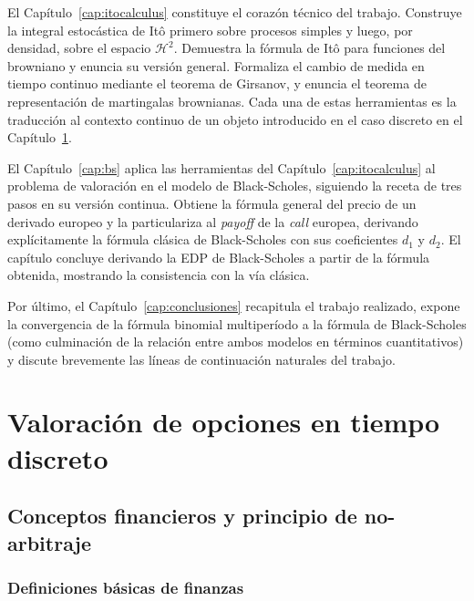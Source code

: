 \documentclass[11pt,a4paper,oneside]{report}
\theoremstyle{plain}
\theoremstyle{definition}
\theoremstyle{remark}
\newcommand{\1}{\mathbf{1}}
\begin{document}
El Capítulo~\ref{cap:itocalculus} constituye el corazón técnico del trabajo. Construye la integral
estocástica de Itô primero sobre procesos simples y luego, por
densidad, sobre el espacio $\mathcal{H}^2$. Demuestra la fórmula de
Itô para funciones del browniano y enuncia su versión general. Formaliza
el cambio de medida en tiempo continuo mediante el teorema de
Girsanov, y enuncia el teorema de representación de martingalas
brownianas. Cada una de estas herramientas es la traducción al contexto
continuo de un objeto introducido en el caso discreto en el
Capítulo~\ref{cap:discreto}.

El Capítulo~\ref{cap:bs} aplica las herramientas del Capítulo~\ref{cap:itocalculus} al problema
de valoración en el modelo de Black-Scholes, siguiendo la receta de
tres pasos en su versión continua. Obtiene la fórmula general del
precio de un derivado europeo y la particulariza al \emph{payoff} de
la \emph{call} europea, derivando explícitamente la fórmula clásica
de Black-Scholes con sus coeficientes $d_1$ y $d_2$. El capítulo
concluye derivando la EDP de Black-Scholes a partir de la fórmula
obtenida, mostrando la consistencia con la vía clásica.

Por último, el Capítulo~\ref{cap:conclusiones} recapitula el trabajo realizado, expone la convergencia de la
fórmula binomial multiperíodo a la fórmula de Black-Scholes (como culminación de la relación entre ambos modelos en términos cuantitativos) y
discute brevemente las líneas de continuación naturales del trabajo.


\chapter{Valoración de opciones en tiempo discreto}\label{cap:discreto}

\section{Conceptos financieros y principio de no-arbitraje}
\label{sec:conceptos_no_arbitraje}

\subsection{Definiciones básicas de finanzas}
\label{subsec:def_basicas}
\end{document}
